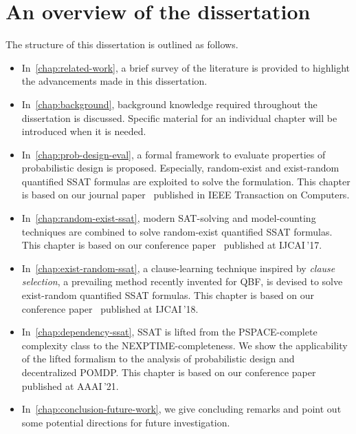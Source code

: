 \section{An overview of the dissertation}
The structure of this dissertation is outlined as follows.
\begin{itemize}
      \item
            In~\cref{chap:related-work}, a brief survey of the literature is provided to highlight the advancements made in this dissertation.
      \item
            In~\cref{chap:background}, background knowledge required throughout the dissertation is discussed.
            Specific material for an individual chapter will be introduced when it is needed.
      \item
            In~\cref{chap:prob-design-eval}, a formal framework to evaluate properties of probabilistic design is proposed.
            Especially, random-exist and exist-random quantified SSAT formulas are exploited to solve the formulation.
            This chapter is based on our journal paper~\cite{LeeTC18ProbDesign} published in IEEE Transaction on Computers.
      \item
            In~\cref{chap:random-exist-ssat}, modern SAT-solving and model-counting techniques are combined to solve random-exist quantified SSAT formulas.
            This chapter is based on our conference paper~\cite{LeeIJCAI17RESSAT} published at IJCAI\,'17.
      \item
            In~\cref{chap:exist-random-ssat}, a clause-learning technique inspired by \textit{clause selection}, a prevailing method recently invented for QBF, is devised to solve exist-random quantified SSAT formulas.
            This chapter is based on our conference paper~\cite{LeeIJCAI18ERSSAT} published at IJCAI\,'18.
      \item
            In~\cref{chap:dependency-ssat}, SSAT is lifted from the PSPACE-complete complexity class to the NEXPTIME-completeness.
            We show the applicability of the lifted formalism to the analysis of probabilistic design and decentralized POMDP.
            This chapter is based on our conference paper~\cite{LeeAAAI21DSSAT} published at AAAI\,'21.
      \item
            In~\cref{chap:conclusion-future-work}, we give concluding remarks and point out some potential directions for future investigation.
\end{itemize}